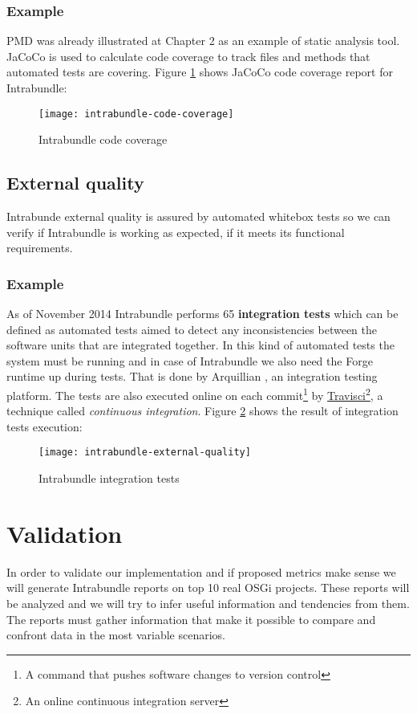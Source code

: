 \subsubsection{Example}
 PMD was already illustrated at Chapter 2 as an example of static analysis tool. JaCoCo is used to calculate code coverage to track files and methods that automated tests are covering. Figure \ref{intrabundle-code-cover} shows JaCoCo code coverage report for Intrabundle:

\begin{figure}[h]
\caption{Intrabundle code coverage}
\label{intrabundle-code-cover}
\texttt{[image: intrabundle-code-coverage]}
\end{figure}

\FloatBarrier
\newpage
\subsection{External quality}
Intrabunde external quality is assured by automated whitebox tests so we can verify if Intrabundle is working as expected, if it meets its functional requirements.

\subsubsection{Example}
As of November 2014 Intrabundle performs 65 \textbf{integration tests} which can be defined as automated tests aimed to detect any inconsistencies between the software units that are integrated together. In this kind of automated tests the system must be running and in case of Intrabundle we also need the Forge runtime up during tests. That is done by Arquillian \citep{dan 2011}, an integration testing platform. The tests are also executed online on each commit\footnote{A command that pushes software changes to version control} by \href{https://travis-ci.org/rmpestano/intrabundle}{Travisci}\footnote{An online continuous integration server}, a technique called \emph{continuous integration}. Figure \ref{intrabundle-integ-tests} shows the result of integration tests execution:

\begin{figure}[h]
\caption{Intrabundle integration tests}
\label{intrabundle-integ-tests}
\texttt{[image: intrabundle-external-quality]}
\centering
\end{figure}

\FloatBarrier

\section{Validation}
In order to validate our implementation and if proposed metrics make sense we will generate Intrabundle reports on top 10 real OSGi projects. These reports will be analyzed and we will try to infer useful information and tendencies from them. The reports must gather information that make it possible to compare and confront data in the most variable scenarios.